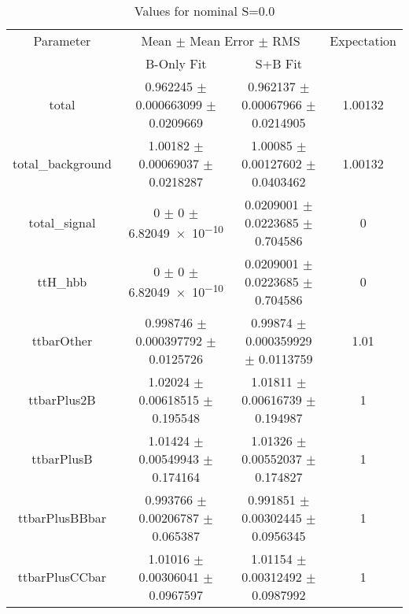 \begin{table}
\centering
\caption{Values for nominal S=0.0}
\begin{tabular}{cccc}
\toprule
Parameter & \multicolumn{2}{c}{Mean $\pm$ Mean Error $\pm$ RMS} & Expectation\\
 & B-Only Fit & S+B Fit & \\
\midrule
total & \num{0.962245} $\pm$ \num{0.000663099} $\pm$ \num{0.0209669} & \num{0.962137} $\pm$ \num{0.00067966} $\pm$ \num{0.0214905} & \num{1.00132}\\
total\_background & \num{1.00182} $\pm$ \num{0.00069037} $\pm$ \num{0.0218287} & \num{1.00085} $\pm$ \num{0.00127602} $\pm$ \num{0.0403462} & \num{1.00132}\\
total\_signal & \num{0} $\pm$ \num{0} $\pm$ \num{6.82049e-10} & \num{0.0209001} $\pm$ \num{0.0223685} $\pm$ \num{0.704586} & \num{0}\\
ttH\_hbb & \num{0} $\pm$ \num{0} $\pm$ \num{6.82049e-10} & \num{0.0209001} $\pm$ \num{0.0223685} $\pm$ \num{0.704586} & \num{0}\\
ttbarOther & \num{0.998746} $\pm$ \num{0.000397792} $\pm$ \num{0.0125726} & \num{0.99874} $\pm$ \num{0.000359929} $\pm$ \num{0.0113759} & \num{1.01}\\
ttbarPlus2B & \num{1.02024} $\pm$ \num{0.00618515} $\pm$ \num{0.195548} & \num{1.01811} $\pm$ \num{0.00616739} $\pm$ \num{0.194987} & \num{1}\\
ttbarPlusB & \num{1.01424} $\pm$ \num{0.00549943} $\pm$ \num{0.174164} & \num{1.01326} $\pm$ \num{0.00552037} $\pm$ \num{0.174827} & \num{1}\\
ttbarPlusBBbar & \num{0.993766} $\pm$ \num{0.00206787} $\pm$ \num{0.065387} & \num{0.991851} $\pm$ \num{0.00302445} $\pm$ \num{0.0956345} & \num{1}\\
ttbarPlusCCbar & \num{1.01016} $\pm$ \num{0.00306041} $\pm$ \num{0.0967597} & \num{1.01154} $\pm$ \num{0.00312492} $\pm$ \num{0.0987992} & \num{1}\\
\bottomrule
\end{tabular}
\end{table}